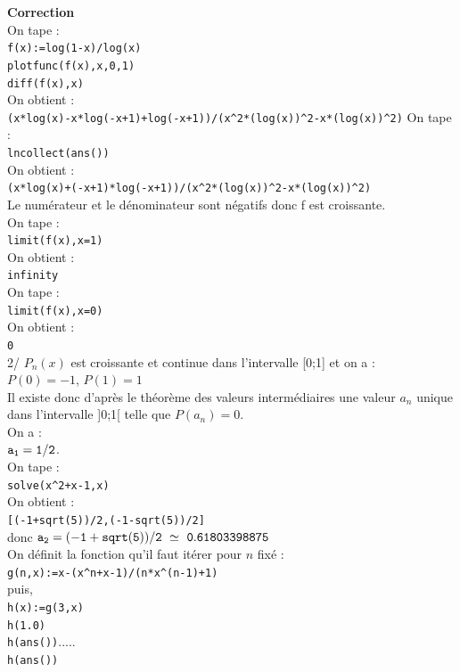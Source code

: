 \documentclass[a4paper,11pt]{book}
\begin{document}
{\bf Correction}\\
On tape :\\
{\tt f(x):=log(1-x)/log(x)}\\
{\tt plotfunc(f(x),x,0,1)}\\
{\tt diff(f(x),x)}\\
On obtient :\\
{\tt (x*log(x)-x*log(-x+1)+log(-x+1))/(x\verb|^|2*(log(x))\verb|^|2-x*(log(x))\verb|^|2)} 
On tape :\\
{\tt lncollect(ans())}\\
On obtient :\\
{\tt (x*log(x)+(-x+1)*log(-x+1))/(x\verb|^|2*(log(x))\verb|^|2-x*(log(x))\verb|^|2)}\\
Le num\'erateur et le d\'enominateur sont n\'egatifs donc f est croissante.\\
On tape :\\
{\tt limit(f(x),x=1)}\\
On obtient :\\
{\tt infinity}\\
On tape :\\
{\tt limit(f(x),x=0)}\\
On obtient :\\
{\tt 0}\\
2/ $P_n(x)$ est croissante et continue dans l'intervalle [0;1] et on a :\\
$P(0)=-1$,  $P(1)=1$\\
Il existe donc d'apr\`es le th\'eor\`eme des valeurs interm\'ediaires une 
valeur $a_n$ unique dans l'intervalle ]0;1[ telle que $P(a_n)=0$.\\ 
On a :\\
${\tt a_1=1/2}$.\\
On tape :\\
{\tt solve(x\verb|^|2+x-1,x)}\\
On obtient :\\
{\tt [(-1+sqrt(5))/2,(-1-sqrt(5))/2]}\\
donc ${\tt a_2=(-1+sqrt(5))/2 \ \simeq\  0.61803398875}$\\
On d\'efinit la fonction qu'il faut it\'erer pour $n$ fix\'e :\\
{\tt g(n,x):={x-(x\verb|^|n+x-1)/(n*x\verb|^|(n-1)+1)}}\\
puis,\\
{\tt h(x):=g(3,x)}\\
{\tt h(1.0)}\\
{\tt h(ans())}.....\\
{\tt h(ans())}\\
\end{document}
